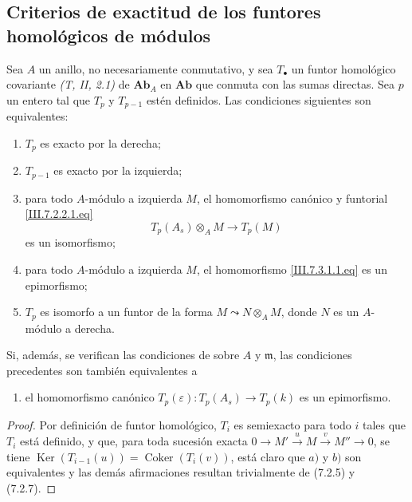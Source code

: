 \subsection{Criterios de exactitud de los funtores homológicos de módulos}
\label{subsection:III.7.3}
\label{subsection:III.7.3.fr}

\begin{proposition}[7.3.1]
\label{III.7.3.1}
Sea $A$ un anillo, no necesariamente conmutativo, y sea
$T_\bullet$ un funtor homológico covariante
\emph{(T, II, 2.1)} de $\boldsymbol{Ab}_A$ en $\boldsymbol{Ab}$ que
conmuta con las sumas directas. Sea $p$ un entero tal que
$T_p$ y $T_{p-1}$ estén definidos. Las condiciones siguientes son
equivalentes:
\begin{enumerate}
  \item[(a)] $T_p$ es exacto por la derecha;
  \item[(b)] $T_{p-1}$ es exacto por la izquierda;


  \item[(c)] para todo $A$-módulo a izquierda $M$, el homomorfismo
    canónico y funtorial \eqref{III.7.2.2.1.eq}
    \[
      T_p(A_s)\otimes_A M\longrightarrow T_p(M)
      \tag{7.3.1.1}\label{III.7.3.1.1.fr}
    \]
    es un isomorfismo;
  \item[(d)] para todo $A$-módulo a izquierda $M$, el homomorfismo
    \eqref{III.7.3.1.1.eq} es un epimorfismo;
  \item[(e)] $T_p$ es isomorfo a un funtor de la forma
    $M\leadsto N\otimes_A M$,
    donde $N$ es un $A$-módulo a derecha.
\end{enumerate}
Si, además, se verifican las condiciones de  sobre
$A$ y $\mathfrak m$, las condiciones precedentes son también
equivalentes a
\begin{enumerate}
  \item[(f)] el homomorfismo canónico
    $T_p(\varepsilon):T_p(A_s)\longrightarrow T_p(k)$
    es un epimorfismo.
\end{enumerate}
\end{proposition}

\begin{proof}
Por definición de funtor homológico, $T_i$ es semiexacto para todo
$i$ tales que $T_i$ está definido, y que, para toda sucesión exacta
$0\longrightarrow M'\xrightarrow{u}M\xrightarrow{v}M''\longrightarrow0$,
se tiene
$\operatorname{Ker}(T_{i-1}(u))=\operatorname{Coker}(T_i(v))$,
está claro que $a)$ y $b)$ son equivalentes y las demás afirmaciones
resultan trivialmente de (7.2.5) y (7.2.7).
\end{proof}

